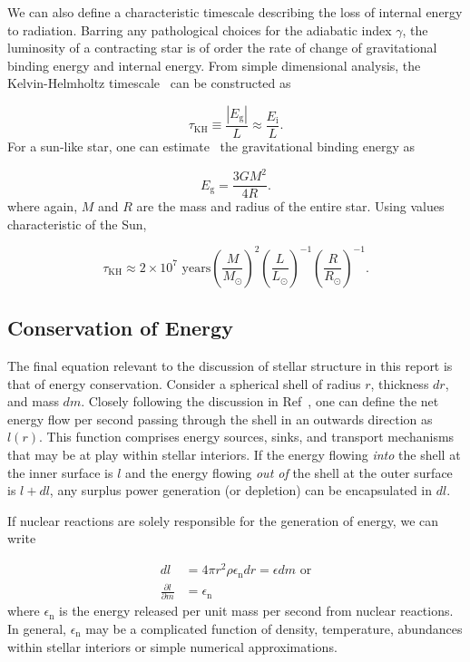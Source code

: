 \documentclass[12pt]{article}
\newcommand{\pderiv}[2]{\frac{\partial #1}{\partial #2}}
\newcommand{\bigparenthesis}[1]{\left(#1\right)}
\begin{document}
We can also define a characteristic timescale describing the loss of internal energy to radiation. Barring any pathological choices for the adiabatic index $\gamma$, the luminosity of a contracting star is of order the rate of change of gravitational binding energy and internal energy. From simple dimensional analysis, the Kelvin-Helmholtz timescale~\cite{KWW_book} can be constructed as

\begin{equation}
\tau_\mathrm{KH} \equiv \frac{|E_\mathrm{g}|}{L} \approx \frac{E_\mathrm{i}}{L}. 
\end{equation}
%
For a sun-like star, one can estimate~\cite{HK_book} the gravitational binding energy as

\begin{equation}
    E_\mathrm{g} = \frac{3GM^2}{4R}.
\end{equation}
%
where again, $M$ and $R$ are the mass and radius of the entire star. Using values characteristic of the Sun, 

\begin{equation}
    \tau_\mathrm{KH} \approx 2 \times 10^7 \text{ years} \bigparenthesis{\frac{M}{M_\odot}}^2 \bigparenthesis{\frac{L}{L_\odot}}^{-1} \bigparenthesis{\frac{R}{R_\odot}}^{-1}.
\end{equation}

\subsection{Conservation of Energy}
The final equation relevant to the discussion of stellar structure in this report is that of energy conservation. Consider a spherical shell of radius $r$, thickness $dr$, and mass $dm$. Closely following the discussion in Ref~\cite{KWW_book}, one can define the net energy flow per second passing through the shell in an outwards direction as $l(r)$. This function comprises energy sources, sinks, and transport mechanisms that may be at play within stellar interiors. If the energy flowing \textit{into} the shell at the inner surface is $l$ and the energy flowing \textit{out of} the shell at the outer surface is $l + dl$, any surplus power generation (or depletion) can be encapsulated in $dl$.

If nuclear reactions are solely responsible for the generation of energy, we can write

\begin{align}
    dl &= 4\pi r^2 \rho \epsilon_\mathrm{n} dr = \epsilon dm \text{ or} \\
    \pderiv{l}{m} &= \epsilon_\mathrm{n}
\end{align}
%
where $\epsilon_\mathrm{n}$ is the energy released per unit mass per second from nuclear reactions. In general, $\epsilon_\mathrm{n}$ may be a complicated function of density, temperature, abundances within stellar interiors or simple numerical approximations.\\
\end{document}

